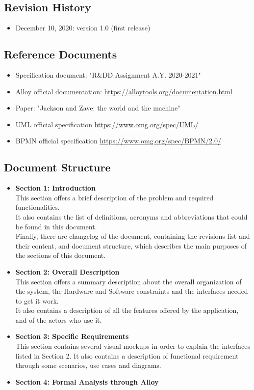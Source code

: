\documentclass[table, 12pt]{article}
\begin{document}
\begin{flushleft}
    \subsection{Revision History}
    \begin{itemize}
        \item December 10, 2020: version 1.0 (first release)
    \end{itemize}
    \subsection{Reference Documents}
    \begin{itemize}
        \item {Specification document: "R\&DD Assignment A.Y. 2020-2021"}
        \item {Alloy official documentation: \href{https://alloytools.org/documentation.html}{https://alloytools.org/documentation.html}}
        \item {Paper: "Jackson and Zave: the world and the machine"}
        \item {UML official specification \href{https://www.omg.org/spec/UML/}{https://www.omg.org/spec/UML/}}
        \item {BPMN official specification \href{https://www.omg.org/spec/BPMN/2.0/}{https://www.omg.org/spec/BPMN/2.0/}}
    \end{itemize}
    \subsection{Document Structure}
    \begin{itemize}
        \item {\textbf{Section 1: Introduction}\\This section offers a brief description of the problem and required functionalities. \\It also contains the list of definitions, acronyms and abbreviations that could be found in this document. \\Finally, there are changelog of the document, containing the revisions list and their content, and document structure, which describes the main purposes of the sections of this document.}
        \item {\textbf{Section 2: Overall Description}\\This section offers a summary description about the overall organization of the system, the Hardware and Software constraints and the interfaces needed to get it work.\\It also contains a description of all the features offered by the application, and of the actors who use it.}
        \item {\textbf{Section 3: Specific Requirements}\\This section contains several visual mockups in order to explain the interfaces listed in Section 2. It also contains a description of functional requirement through some scenarios, use cases and diagrams.}
        \item {\textbf{Section 4: Formal Analysis through Alloy}}
    \end{itemize}
    \newpage

\end{flushleft}
\end{document}
